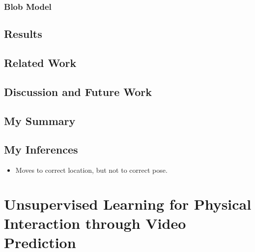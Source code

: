 \documentclass{article}
\begin{document}
    \subsubsection{Blob Model}\label{subsubsec:Learning_to_Poke_by_Poking_Experiential_Learning_of_Intuitive_Physics_(NIPS_2016):blob-model}

    \subsection{Results}\label{subsec:Learning_to_Poke_by_Poking_Experiential_Learning_of_Intuitive_Physics_(NIPS_2016):results}

    \subsection{Related Work}\label{subsec:Learning_to_Poke_by_Poking_Experiential_Learning_of_Intuitive_Physics_(NIPS_2016):related-work}

    \subsection{Discussion and Future Work}\label{subsec:Learning_to_Poke_by_Poking_Experiential_Learning_of_Intuitive_Physics_(NIPS_2016):discussion-and-future-work}

    \subsection{My Summary}\label{subsec:Learning_to_Poke_by_Poking_Experiential_Learning_of_Intuitive_Physics_(NIPS_2016):my-summary}

    \subsection{My Inferences}\label{subsec:Learning_to_Poke_by_Poking_Experiential_Learning_of_Intuitive_Physics_(NIPS_2016):my-inferences}
    \begin{itemize}
        \item Moves to correct location, but not to correct pose.
    \end{itemize}
    \newpage


    \section{Unsupervised Learning for Physical Interaction through Video Prediction}\label{sec:Unsupervised_Learning_for_Physical_Interaction_through_Video_Prediction}
\end{document}
